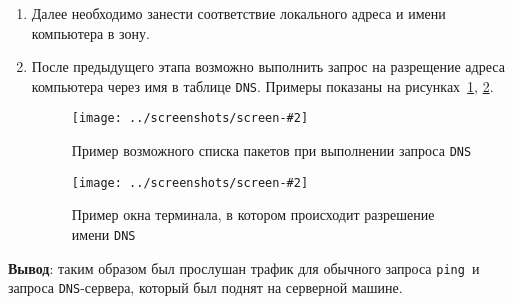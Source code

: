 \documentclass[14pt,a4paper]{extreport}
\newcommand{\screenshot}[2]{\begin{figure}[ht]%
\centering\texttt{[image: ../screenshots/screen-\#2]}%
\caption{\protect #1}%
\label{picture#2}%
\end{figure}%
}
\newcommand{\ping}{\texttt{ping }}
\newcommand{\dns}{\texttt{DNS}}
\begin{document}
\begin{enumerate}
\item Далее необходимо занести соответствие локального адреса и имени компьютера в зону.

\item После предыдущего этапа возможно выполнить запрос на разрещение адреса компьютера через имя в таблице \dns . Примеры показаны на рисунках~\ref{picture11}, \ref{picture12}.

\screenshot{Пример возможного списка пакетов при выполнении запроса \dns}{11}
\screenshot{Пример окна терминала, в котором происходит разрешение имени \dns}{12}

\end{enumerate}

\clearpage

\textbf{Вывод}: таким образом был прослушан трафик для обычного запроса \ping и запроса \dns {}-сервера, который был поднят на серверной машине.
\end{document}
